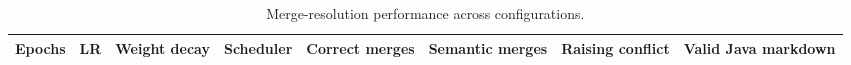 \begin{table}[ht]
\centering
\begin{tabular}{l l l l r r r r}
\toprule
Epochs & LR & Weight decay & Scheduler & Correct merges & Semantic merges & Raising conflict & Valid Java markdown \\
\midrule
\bottomrule
\end{tabular}
\caption{Merge-resolution performance across configurations.}
\end{table}
